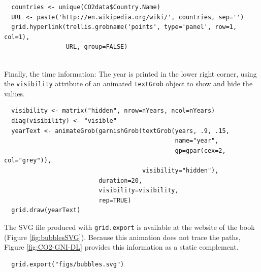 \documentclass[smallroyalvopaper]{memoir}
\begin{document}

\lstset{language=r,label= ,caption= ,captionpos=b,numbers=none}
\begin{lstlisting}
  countries <- unique(CO2data$Country.Name)
  URL <- paste('http://en.wikipedia.org/wiki/', countries, sep='')
  grid.hyperlink(trellis.grobname('points', type='panel', row=1, col=1),
                 URL, group=FALSE)
  
\end{lstlisting}

Finally, the time information: The year is printed in the lower
right corner, using the \texttt{visibility} attribute of an animated
\texttt{textGrob} object to show and hide the values.
\lstset{language=r,label= ,caption= ,captionpos=b,numbers=none}
\begin{lstlisting}
  visibility <- matrix("hidden", nrow=nYears, ncol=nYears)
  diag(visibility) <- "visible"
  yearText <- animateGrob(garnishGrob(textGrob(years, .9, .15,
                                               name="year",
                                               gp=gpar(cex=2, col="grey")),
                                      visibility="hidden"),
                          duration=20,
                          visibility=visibility,
                          rep=TRUE)
  grid.draw(yearText)
\end{lstlisting}

The SVG file produced with \texttt{grid.export} is available at the website
of the book (Figure \ref{fig:bubblesSVG}). Because this animation does
not trace the paths, Figure \ref{fig:CO2-GNI-DL} provides this
information as a static complement.


\lstset{language=r,label= ,caption= ,captionpos=b,numbers=none}
\begin{lstlisting}
  grid.export("figs/bubbles.svg")
\end{lstlisting}
\end{document}
